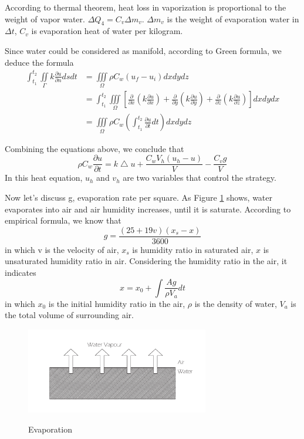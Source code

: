 \documentclass[12pt,a4paper,titlepage]{article}
\begin{document}
According to thermal theorem, heat loss in vaporization is proportional to the weight of vapor water.
$\Delta Q_4={C_v}\Delta {m_v}$.
$\Delta {m_v}$ is the weight of evaporation water in $\Delta t$, ${C_v}$ is evaporation heat of water per kilogram.

Since water could be considered as manifold, according to Green formula, we deduce the formula
\begin{displaymath}
\begin{aligned}
\int_{t_1}^{t_2} \iint\limits_{\Gamma}k\frac{\partial u}{\partial n}dsdt & =\iiint\limits_{\Omega}\rho C_{w}(u_f - u_i)dx dy dz\\
& =\int_{t_1}^{t_2}\iiint\limits_{\Omega}[\frac{\partial}{\partial x}(k\frac{\partial u}{\partial x})+\frac{\partial}{\partial y}(k\frac{\partial u}{\partial y})+\frac{\partial}{\partial z}(k\frac{\partial u}{\partial z})]dxdydx\\
& = \iiint\limits_{\Omega}\rho C_{w}(\int_{t_1}^{t_2}\frac{\partial u}{\partial t}dt)dxdydz
\end{aligned}
\end{displaymath}

Combining the equations above, we conclude that
\begin{equation}
\rho C_{w}\frac{\partial u}{\partial t}=k\bigtriangleup u+\frac{C_w V_h(u_h-u)}{V}-\frac{C_v g}{V}%
\end{equation}
In this heat equation, $u_h$ and $v_h$ are two variables that control the strategy.

Now let's discuss g, evaporation rate per square.
As Figure \ref{3_p} shows, water evaporates into air and air humidity increases, until it is saturate. According to empirical formula\cite{1}, we know that
\begin{equation}
 g=\frac{(25+19v)({x_s}-x)}{3600}
\end{equation}
in which v is the velocity of air, ${x_s}$ is humidity ratio in saturated air, $x$ is unsaturated humidity ratio in air.
Considering the humidity ratio in the air, it indicates
\begin{equation}
 x=x_0+\int \frac{Ag}{\rho V_a}dt
\end{equation}
in which $x_0$ is the initial humidity ratio in the air, $\rho$ is the density of water, $V_a$ is the total volume of surrounding air.
\begin{figure}[htb]
  \centering
  \includegraphics[width=8cm]{3.pdf}\\
  \caption{Evaporation}\label{3_p}
\end{figure}
\end{document}
